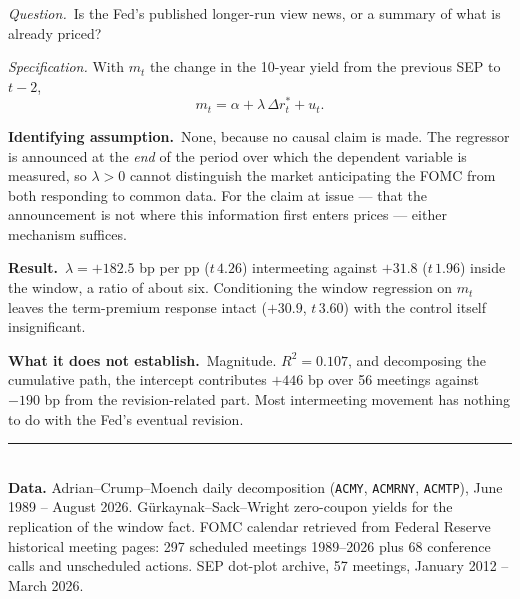\documentclass[11pt]{article}
\newcommand{\qq}[1]{\vspace{0.3em}\noindent\textit{Question.}\ #1}
\newcommand{\ia}[1]{\vspace{0.4em}\noindent\textbf{Identifying assumption.}\ #1}
\newcommand{\res}[1]{\vspace{0.4em}\noindent\textbf{Result.}\ #1}
\newcommand{\limn}[1]{\vspace{0.4em}\noindent\textbf{What it does not establish.}\ #1}
\begin{document}
\qq{Is the Fed's published longer-run view news, or a summary of what is already priced?}

\vspace{0.4em}\noindent\textit{Specification.} With $m_t$ the change in the 10-year yield from the previous SEP to $t-2$,
\begin{equation}
m_t=\alpha+\lambda\,\Delta r^*_t+u_t .
\end{equation}

\ia{None, because no causal claim is made. The regressor is announced at the \emph{end} of the period over which the dependent variable is measured, so $\lambda>0$ cannot distinguish the market anticipating the FOMC from both responding to common data. For the claim at issue --- that the announcement is not where this information first enters prices --- either mechanism suffices.}

\res{$\lambda=+182.5$ bp per pp ($t\,4.26$) intermeeting against $+31.8$ ($t\,1.96$) inside the window, a ratio of about six. Conditioning the window regression on $m_t$ leaves the term-premium response intact ($+30.9$, $t\,3.60$) with the control itself insignificant.}

\limn{Magnitude. $R^2=0.107$, and decomposing the cumulative path, the intercept contributes $+446$ bp over 56 meetings against $-190$ bp from the revision-related part. Most intermeeting movement has nothing to do with the Fed's eventual revision.}

\vspace{1.2em}\noindent\rule{\textwidth}{0.4pt}\\[0.3em]
\footnotesize
\textbf{Data.} Adrian--Crump--Moench daily decomposition (\texttt{ACMY}, \texttt{ACMRNY}, \texttt{ACMTP}), June 1989 -- August 2026. G\"urkaynak--Sack--Wright zero-coupon yields for the replication of the window fact. FOMC calendar retrieved from Federal Reserve historical meeting pages: 297 scheduled meetings 1989--2026 plus 68 conference calls and unscheduled actions. SEP dot-plot archive, 57 meetings, January 2012 -- March 2026.
\end{document}
